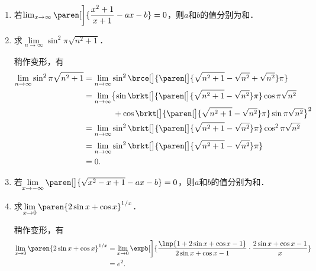 \begin{enumerate}
\item 若\(\lim_{x\to\infty} \paren[\bigg]{\dfrac{x^2+1}{x+1} - ax -b} = 0\)，则\(a\)和\(b\)的值分别为\uline{}和\uline{}．

\item 求\(\lim\limits_{n\to\infty} \sin^2 \pi\sqrt{n^2+1}\)．

  \ifshowsol
  稍作变形，有
  \begin{align*}
    \lim_{n \to \infty} \sin^2 \pi\sqrt{n^2+1}
    &= \lim_{n \to \infty} \sin^2 \brce[\big]{\paren[\big]{\sqrt{n^2+1} - \sqrt{n^2} + \sqrt{n^2}} \pi} \\
    &= \lim_{n \to \infty}
      \bigl\lbrace
      \sin\brkt[\big]{\paren[\big]{\sqrt{n^2+1} - \sqrt{n^2}}\pi}
      \cos\pi\sqrt{n^2} \\
    &\hphantom{= \lim_{n \to \infty} \lbrace} +
      \cos\brkt[\big]{\paren[\big]{\sqrt{n^2+1} - \sqrt{n^2}}\pi}
      \sin\pi\sqrt{n^2}
      \bigr\rbrace^2 \\
    &= \lim_{n \to \infty}
      \sin^2\brkt[\big]{\paren[\big]{\sqrt{n^2+1} - \sqrt{n^2}}\pi}
      \cos^2\pi\sqrt{n^2} \\
    &= \lim_{n \to \infty} \sin^2\brkt[\big]{\paren[\big]{\sqrt{n^2+1} - \sqrt{n^2}}\pi} \\
    &= 0.
  \end{align*}
  \fi

\item 若\(\!\lim\limits_{x\to-\infty} \paren[\big]{\sqrt{x^2 - x + 1} - ax - b} = 0\)，则\(a\)和\(b\)的值分别为\uline{}和\uline{}．

\item 求\(\lim\limits_{x\to0} \paren{2 \sin x + \cos x}^{1/x}\)．

  \ifshowsol
  稍作变形，有
  \begin{align*}
    \lim_{x\to0} \paren{2 \sin x + \cos x}^{1/x}
    &= \lim_{x\to0} \expb[\bigg]{
      \frac{\lnp{1 + 2 \sin x + \cos x - 1}}{2 \sin x + \cos x - 1}
      \cdot
      \frac{2 \sin x + \cos x - 1}{x}} \\
    &= e^2.
  \end{align*}
  \fi


\end{enumerate}
